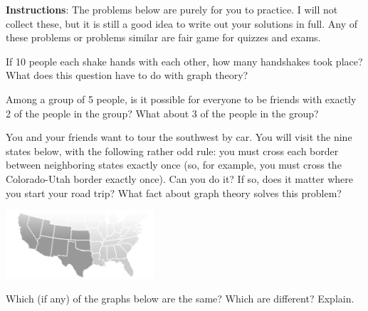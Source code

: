 \documentclass[11pt]{exam}
\newcommand{\vtx}[2]{node[fill,circle,inner sep=0pt, minimum size=7pt,label=#1:#2]{}}
\renewcommand{\v}{\vtx{above}{}}
\begin{document}
\noindent \textbf{Instructions}: The problems below are purely for you to practice.  I will not collect these, but it is still a good idea to write out your solutions in full.  Any of these problems or problems similar are fair game for quizzes and exams.  

\begin{questions}

\question If 10 people each shake hands with each other, how many handshakes took place?  What does this question have to do with graph theory?

\question Among a group of 5 people, is it possible for everyone to be friends with exactly 2 of the people in the group?  What about 3 of the people in the group?

\question You and your friends want to tour the southwest by car.  You will visit the nine states below, with the following rather odd rule: you must cross each border between neighboring states exactly once (so, for example, you must cross the Colorado-Utah border exactly once).  Can you do it?  If so, does it matter where you start your road trip?  What fact about graph theory solves this problem?

\centerline{\includegraphics[height=1in]{images/southwest_map.png}}

\question Which (if any) of the graphs below are the same?  Which are different?  Explain.

\begin{center}
  \hfill
  \hfill



\end{center}
\end{questions}
\end{document}
